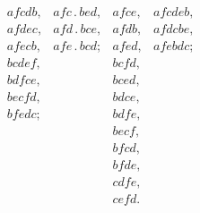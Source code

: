 \documentclass[11pt]{article}
\begin{document}
\[\begin{array}{lllllll}
   &            & afcdb, & afc\,.\,bed, & afce, & afcdeb, & \\
   &            & afdec, & afd\,.\,bce, & afdb, & afdcbe, & \\
   &            & afecb, & afe\,.\,bcd; & afed, & afebdc; & \\
   &            & bcdef, &              & bcfd, &         & \\
   &            & bdfce, &              & bced, &         & \\
   &            & becfd, &              & bdce, &         & \\
   &            & bfedc; &              & bdfe, &         & \\
   &            &        &              & becf, &         & \\
   &            &        &              & bfcd, &         & \\
   &            &        &              & bfde, &         & \\
   &            &        &              & cdfe, &         & \\
   &            &        &              & cefd. &         & \\
\end{array}
\]
\end{document}
